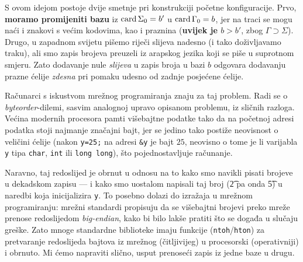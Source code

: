 S ovom idejom postoje dvije smetnje pri konstrukciji početne konfiguracije. Prvo, \textbf{moramo promijeniti bazu} iz $\operatorname{card}\Sigma_0=b'$ u $\operatorname{card}\Gamma_0=b$, jer na traci se mogu naći i znakovi s većim kodovima, kao i praznina (\textbf{uvijek je $b>b'$}, zbog $\Gamma\supset\Sigma$). Drugo, u zapadnom svijetu pišemo riječi slijeva nadesno (i tako doživljavamo traku), ali smo zapis brojeva preuzeli iz arapskog jezika koji se piše u suprotnom smjeru. Zato dodavanje nule \emph{slijeva} u zapis broja u bazi $b$ odgovara dodavanju prazne ćelije \emph{zdesna} pri pomaku udesno od zadnje posjećene ćelije.

Računarci s iskustvom mrežnog programiranja znaju za taj problem. Radi se o \emph{byteorder}-dilemi, sasvim analognoj upravo opisanom problemu, iz sličnih razloga. Većina modernih procesora pamti višebajtne podatke tako da na početnoj adresi podatka stoji najmanje značajni bajt, jer se jedino tako postiže neovisnost o veličini ćelije %
(nakon \texttt{y=25;} na adresi \texttt{\&y} je bajt $25$, neovisno o tome je li varijabla \texttt y tipa \texttt{char}, \texttt{int} ili \texttt{long~long}), što pojednostavljuje računanje. %

Naravno, taj redoslijed je obrnut u odnosu na to kako smo navikli pisati brojeve u dekadskom zapisu --- i kako smo uostalom napisali taj broj (\t2 pa onda \t5) u naredbi koja inicijalizira \texttt y. To posebno dolazi do izražaja u mrežnom programiranju: mrežni standardi propisuju da se višebajtni brojevi preko mreže prenose redoslijedom \emph{big-endian}, kako bi bilo lakše pratiti što se događa u slučaju greške. Zato mnoge standardne biblioteke imaju funkcije (\texttt{ntoh}/\texttt{hton}) za pretvaranje redoslijeda bajtova iz mrežnog (čitljivijeg) u procesorski (operativniji) i obrnuto. Mi ćemo napraviti slično, usput prenoseći zapis iz jedne baze u drugu.

